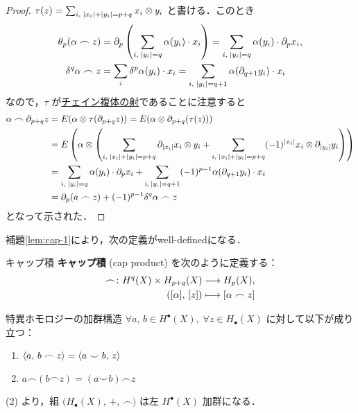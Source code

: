 \documentclass[algtopo_main]{subfiles}
\begin{document}
\begin{proof}
    $\tau(z) = \sum_{i,\; \abs{x_i} + \abs{y_i} = p+q} x_i \otimes y_i$ と書ける．このとき
    \begin{align}
        \theta_p (\alpha \frown z) &= \partial_p \left( \sum_{i,\; \abs{y_i} = q} \alpha(y_i) \cdot x_i  \right) = \sum_{i,\; \abs{y_i} = q} \alpha(y_i) \cdot \partial_p x_i, \\
        \delta^q \alpha \frown z &= \sum_i \delta^p \alpha (y_i) \cdot x_i = \sum_{i,\;\abs{y_i} = q+1} \alpha(\partial_{q+1} y_i) \cdot x_i
    \end{align}
    なので，$\tau$ が\hyperref[def:chainmap]{チェイン複体の射}であることに注意すると
    \begin{align}
        \alpha \frown \partial_{p+q} z &= E(\alpha \otimes \tau(\partial_{p+q} z)) = E(\alpha \otimes \partial_{p+q} (\tau(z))) \\
        &= E \left( \alpha \otimes \left( \sum_{i,\; \abs{x_i} + \abs{y_i} = p+q}\partial_{\abs{x_i}} x_i \otimes y_i + \sum_{i,\; \abs{x_i} + \abs{y_i} = p+q} (-1)^{\abs{x_i}} x_i \otimes \partial_{\abs{y_i}} y_i \right)  \right)  \\
        &= \sum_{i,\; \abs{y_i} = q} \alpha(y_i) \cdot \partial_p x_i + \sum_{i,\, \abs{y_i} = q+1} (-1)^{p-1} \alpha(\partial_{q+1} y_i) \cdot x_i \\
        &= \partial_p (a \frown z)  + (-1)^{p-1} \delta^q \alpha \frown z
    \end{align}
    となって示された．
\end{proof}
補題\ref{lem:cap-1}により，次の定義がwell-definedになる．
\begin{mydef}[label=def:cap]{キャップ積}
    \textbf{キャップ積} (cap product) を次のように定義する：
    \begin{align}
        \frown \colon H^q(X) \times H_{p+q} (X) &\longrightarrow H_p(X),\\
        ([\alpha],\, [z]) &\longmapsto [\alpha \frown z]
    \end{align}
\end{mydef}

\begin{mytheo}[label=thm:mod-homology]{特異ホモロジーの加群構造}
    $\forall a,\, b \in H^\bullet (X),\; \forall z \in H_\bullet (X)$ に対して以下が成り立つ：
    \begin{enumerate}
        \item $\expval{a,\, b \frown z} = \expval{a \smile b,\, z}$
        \item $a \frown (b \frown z) = (a \smile b) \frown z$
    \end{enumerate}
    (2) より，組 $\bigl( H_\bullet (X),\, +,\, \frown \bigr)$ は左 $H^\bullet (X)$ 加群になる．
\end{mytheo}
\end{document}
